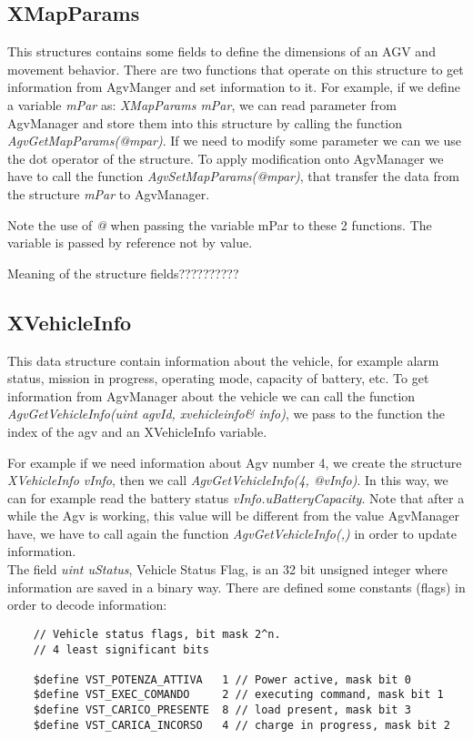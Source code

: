 \subsection{XMapParams}
This structures contains some fields to define the dimensions of an AGV and movement behavior. There are two functions that operate on this structure to get information from AgvManger and set information to it.
For example, if we define a variable \textit{mPar} as: \textit{XMapParams mPar}, we can read parameter from AgvManager and store them into this structure by calling the function \textit{AgvGetMapParams(@mpar)}.
If we need to modify some parameter we can we use the dot operator of the structure.
To apply modification onto AgvManager we have to call the function \textit{AgvSetMapParams(@mpar)}, that transfer the data from the structure \textit{mPar} to AgvManager.

Note the use of \textit{@} when passing the variable mPar to these 2 functions. The variable is passed by reference not by value.

Meaning of the structure fields??????????

\subsection{XVehicleInfo}
This data structure contain information about the vehicle, for example alarm status, mission in progress, operating mode, capacity of battery, etc.
To get information from AgvManager about the vehicle we can call the function \textit{AgvGetVehicleInfo(uint agvId, xvehicleinfo\& info)}, we pass to the function the index of the agv and an XVehicleInfo variable.

For example if we need information about Agv number 4, we create the structure \textit{XVehicleInfo vInfo}, then we call \textit{AgvGetVehicleInfo(4, @vInfo)}.
In this way, we can for example read the battery status \textit{vInfo.uBatteryCapacity}. Note that after a while the Agv is working, this value will be different from the value AgvManager have, we have to call again the function \textit{AgvGetVehicleInfo(,)} in order to update information.\\

The field \textit{uint uStatus}, Vehicle Status Flag,  is an 32 bit unsigned integer where information are saved in a binary way. There are defined some constants (flags) in order to decode information:
\begin{lstlisting}
	// Vehicle status flags, bit mask 2^n.
	// 4 least significant bits
	
	$define VST_POTENZA_ATTIVA   1 // Power active, mask bit 0
	$define VST_EXEC_COMANDO     2 // executing command, mask bit 1
	$define VST_CARICO_PRESENTE  8 // load present, mask bit 3
	$define VST_CARICA_INCORSO   4 // charge in progress, mask bit 2
\end{lstlisting}

